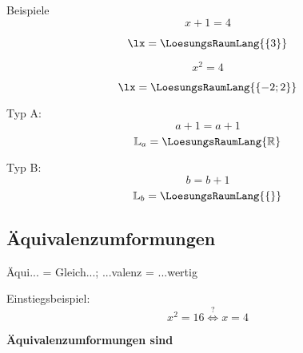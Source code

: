   Beispiele
$$x+1=4$$
  
  $$\lx=\LoesungsRaumLang{\{3\}}$$


  $$x^2=4$$

  $$\lx=\LoesungsRaumLang{\{-2; 2\}}$$

Typ A:
$$a+1=a+1$$
   $$\mathbb{L}_a= \LoesungsRaumLang{\mathbb{R}}$$


Typ B:
$$b = b+1$$
$$\mathbb{L}_b=\LoesungsRaumLang{\{\}}$$

\newpage

\subsection{Äquivalenzumformungen}
Äqui... = Gleich...; ...valenz = ...wertig




Einstiegsbeispiel:
\vspace{5mm}
$$x^2 = 16  \stackrel{?}{\Longleftrightarrow} x=4$$

\textbf{{\color{ForestGreen}Äquivalenzumformungen sind}}

